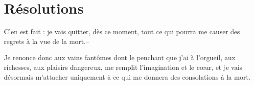 \documentclass[instructions.tex]{subfiles}
\begin{document}
\section{Résolutions}
 
\primo C’en est fait : je vais quitter, dès ce moment, tout ce qui pourra me causer des regrets à la vue de la mort.--
 
\secundo Je renonce donc aux vains fantômes dont le penchant que j’ai à l’orgueil, aux richesses, aux plaisirs dangereux, me remplit l’imagination et le cœur, et je vais désormais m’attacher uniquement à ce qui me donnera des consolations à la mort.

 
\end{document}
